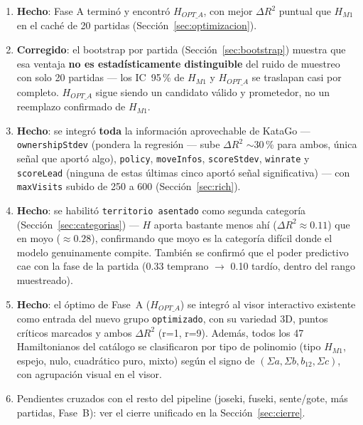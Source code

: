 \documentclass[11pt, a4paper]{article}
\newcommand{\good}[1]{\color{cGood}\textbf{#1}}
\newcommand{\bad}[1]{\color{cBad}\textbf{#1}}
\begin{document}
\begin{enumerate}
  \item \good{Hecho}: Fase A termin\'o y encontr\'o $H_{OPT\_A}$, con
        mejor $\Delta R^2$ puntual que $H_{M1}$ en el cach\'e de 20
        partidas (Secci\'on~\ref{sec:optimizacion}).
  \item \bad{Corregido}: el bootstrap por partida
        (Secci\'on~\ref{sec:bootstrap}) muestra que esa ventaja
        \textbf{no es estad\'isticamente distinguible} del ruido de
        muestreo con solo 20 partidas --- los IC~95\,\% de $H_{M1}$ y
        $H_{OPT\_A}$ se traslapan casi por completo. $H_{OPT\_A}$ sigue
        siendo un candidato v\'alido y prometedor, no un reemplazo
        confirmado de $H_{M1}$.
  \item \good{Hecho}: se integr\'o \textbf{toda} la informaci\'on
        aprovechable de KataGo --- \texttt{ownershipStdev} (pondera la
        regresi\'on --- sube $\Delta R^2$ $\sim$30\,\% para ambos,
        \'unica se\~nal que aport\'o algo), \texttt{policy},
        \texttt{moveInfos}, \texttt{scoreStdev}, \texttt{winrate} y
        \texttt{scoreLead} (ninguna de estas \'ultimas cinco aport\'o
        se\~nal significativa) --- con \texttt{maxVisits} subido de
        250 a 600 (Secci\'on~\ref{sec:rich}).
  \item \good{Hecho}: se habilit\'o \texttt{territorio asentado} como
        segunda categor\'ia (Secci\'on~\ref{sec:categorias}) --- $H$
        aporta bastante menos ah\'i ($\Delta R^2\approx0.11$) que en
        moyo ($\approx0.28$), confirmando que moyo es la categor\'ia
        dif\'icil donde el modelo genuinamente compite. Tambi\'en se
        confirm\'o que el poder predictivo cae con la fase de la
        partida (0.33 temprano $\to$ 0.10 tard\'io, dentro del rango
        muestreado).
  \item \good{Hecho}: el \'optimo de Fase~A ($H_{OPT\_A}$) se integr\'o
        al visor interactivo existente como entrada del nuevo grupo
        \texttt{optimizado}, con su variedad 3D, puntos cr\'iticos
        marcados y ambos $\Delta R^2$ (r=1, r=9). Adem\'as, todos los
        47 Hamiltonianos del cat\'alogo se clasificaron por tipo de
        polinomio (tipo $H_{M1}$, espejo, nulo, cuadr\'atico puro,
        mixto) seg\'un el signo de $(\Sigma a,\Sigma b,b_{12},\Sigma c)$,
        con agrupaci\'on visual en el visor.
  \item Pendientes cruzados con el resto del pipeline (joseki, fuseki,
        sente/gote, m\'as partidas, Fase~B): ver el cierre unificado en
        la Secci\'on~\ref{sec:cierre}.
\end{enumerate}
\end{document}
